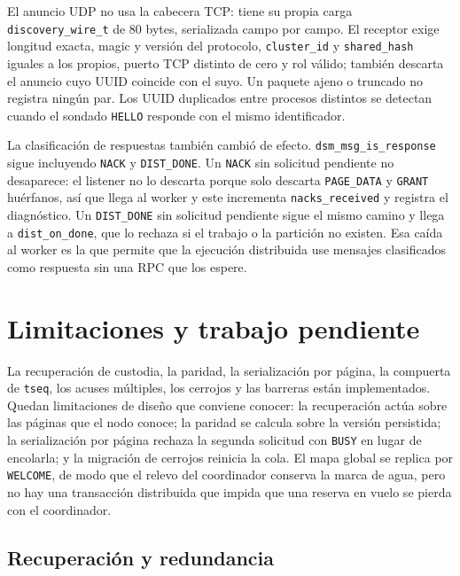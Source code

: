 \documentclass[11pt,spanish]{article}
\begin{document}
El anuncio UDP no usa la cabecera TCP: tiene su propia carga \texttt{discovery\_wire\_t} de 80 bytes, serializada campo por campo. El receptor exige longitud exacta, magic y versión del protocolo, \texttt{cluster\_id} y \texttt{shared\_hash} iguales a los propios, puerto TCP distinto de cero y rol válido; también descarta el anuncio cuyo UUID coincide con el suyo. Un paquete ajeno o truncado no registra ningún par. Los UUID duplicados entre procesos distintos se detectan cuando el sondado \texttt{HELLO} responde con el mismo identificador.

La clasificación de respuestas también cambió de efecto. \texttt{dsm\_msg\_is\_response} sigue incluyendo \texttt{NACK} y \texttt{DIST\_DONE}. Un \texttt{NACK} sin solicitud pendiente no desaparece: el listener no lo descarta porque solo descarta \texttt{PAGE\_DATA} y \texttt{GRANT} huérfanos, así que llega al worker y este incrementa \texttt{nacks\_received} y registra el diagnóstico. Un \texttt{DIST\_DONE} sin solicitud pendiente sigue el mismo camino y llega a \texttt{dist\_on\_done}, que lo rechaza si el trabajo o la partición no existen. Esa caída al worker es la que permite que la ejecución distribuida use mensajes clasificados como respuesta sin una RPC que los espere.

\section{Limitaciones y trabajo pendiente}\label{sec:pendientes}

La recuperación de custodia, la paridad, la serialización por página, la compuerta de \texttt{tseq}, los acuses múltiples, los cerrojos y las barreras están implementados. Quedan limitaciones de diseño que conviene conocer: la recuperación actúa sobre las páginas que el nodo conoce; la paridad se calcula sobre la versión persistida; la serialización por página rechaza la segunda solicitud con \texttt{BUSY} en lugar de encolarla; y la migración de cerrojos reinicia la cola. El mapa global se replica por \texttt{WELCOME}, de modo que el relevo del coordinador conserva la marca de agua, pero no hay una transacción distribuida que impida que una reserva en vuelo se pierda con el coordinador.

\subsection{Recuperación y redundancia}
\end{document}
